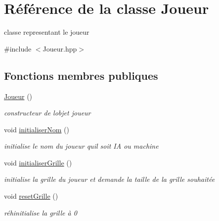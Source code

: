 \hypertarget{class_joueur}{}\section{Référence de la classe Joueur}
\label{class_joueur}


classe representant le joueur  




{\ttfamily \#include $<$Joueur.\+hpp$>$}

\subsection*{Fonctions membres publiques}
\begin{DoxyCompactItemize}
\item 
\mbox{\label{class_joueur_a951f6cb508b2d681eac4be586b8aac5f}} 
\mbox{\hyperlink{class_joueur_a951f6cb508b2d681eac4be586b8aac5f}{Joueur}} ()
\begin{DoxyCompactList}\small\item\em constructeur de l\textquotesingle{}objet joueur \end{DoxyCompactList}\item 
\mbox{\label{class_joueur_a783216cfa2c14d498f28158d94cfcd5b}} 
void \mbox{\hyperlink{class_joueur_a783216cfa2c14d498f28158d94cfcd5b}{initialiser\+Nom}} ()
\begin{DoxyCompactList}\small\item\em initialise le nom du joueur qu\textquotesingle{}il soit IA ou machine \end{DoxyCompactList}\item 
\mbox{\label{class_joueur_a8688a9c5db313aa5260003b9baf93ff3}} 
void \mbox{\hyperlink{class_joueur_a8688a9c5db313aa5260003b9baf93ff3}{initialiser\+Grille}} ()
\begin{DoxyCompactList}\small\item\em initialise la grille du joueur et demande la taille de la grille souhaitée \end{DoxyCompactList}\item 
\mbox{\label{class_joueur_a1fec5128194cad6a1f487c2c144f629f}} 
void \mbox{\hyperlink{class_joueur_a1fec5128194cad6a1f487c2c144f629f}{reset\+Grille}} ()
\begin{DoxyCompactList}\small\item\em réhinitialise la grille à 0 \end{DoxyCompactList}\item 

\end{DoxyCompactItemize}
